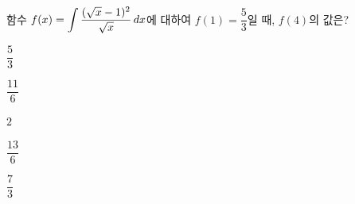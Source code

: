함수 $f(x)=\displaystyle\int \dfrac{(\sqrt{x}-1)^2}{\sqrt{x}}\mkern3mu dx$에 대하여 $f(1)=\dfrac{5}{3}$일 때, $f(4)$의 값은?
\begin{choices32}{\rule[-3ex]{0pt}{8ex}$\dfrac{5}{3}$}{\rule[-3ex]{0pt}{8ex}$\dfrac{11}{6}$}{\rule[-3ex]{0pt}{8ex}$2$}{\rule[-3ex]{0pt}{8ex}$\dfrac{13}{6}$}{\rule[-3ex]{0pt}{8ex}$\dfrac{7}{3}$}\end{choices32}
